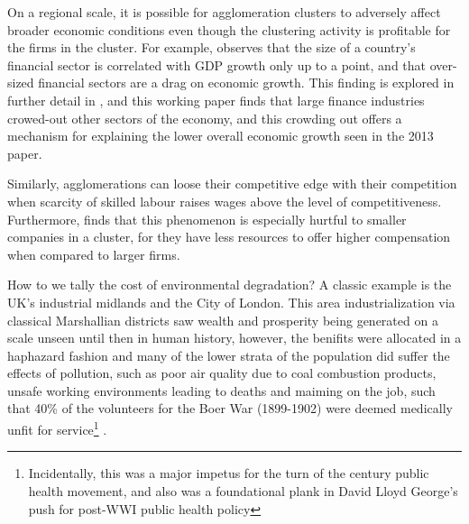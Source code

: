 \documentclass[12pt,letterpaper,notitlepage,onecolumn,final,openbib]{article}
\begin{document}
On a regional scale, it is possible for agglomeration clusters to adversely affect broader economic conditions even though the clustering activity is profitable for the firms in the cluster.  For example,  observes that the size of a country's financial sector is correlated with GDP growth only up to a point, and that over-sized financial sectors are a drag on economic growth.  This finding is explored in further detail in , and this working paper finds that large finance industries crowed-out other sectors of the economy, and this crowding out offers a mechanism for explaining the lower overall economic growth seen in the 2013 paper. 

Similarly, agglomerations can loose their competitive edge with their competition when scarcity of skilled labour raises wages above the level of competitiveness.  Furthermore,  finds that this phenomenon is especially hurtful to smaller companies in a cluster, for they have less resources to offer higher compensation when compared to larger firms.  

How to we tally the cost of environmental degradation?  A classic example is the UK's industrial midlands and the City of London.  This area industrialization via classical Marshallian districts saw wealth and prosperity being generated on a scale unseen until then in human history, however, the benifits were allocated in a haphazard fashion and many of the lower strata of the population did suffer the effects of pollution, such as poor air quality due to coal combustion products, unsafe working environments leading to deaths and maiming on the job, such that 40\% of the volunteers for the Boer War (1899-1902) were deemed medically unfit for service\footnote{Incidentally, this was a major impetus for the turn of the century public health movement, and also was a foundational plank in David Lloyd George's push for post-WWI public health policy\cite{hall2002cities}} \cite{hall2002cities}.  


%

%
%	
%			
\end{document}
